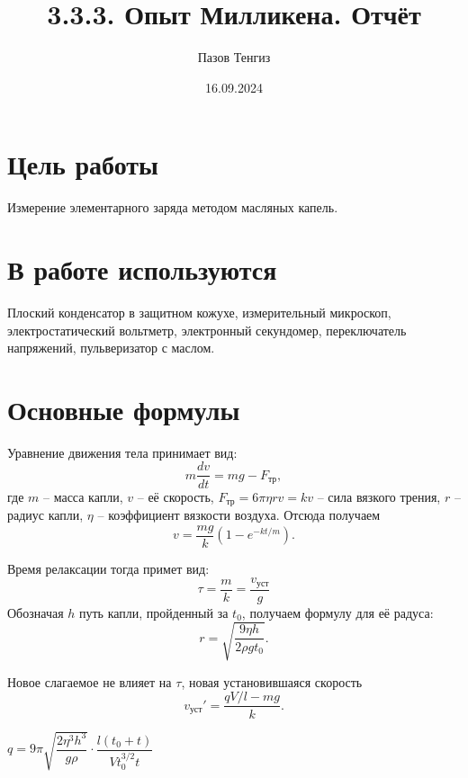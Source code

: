 \documentclass[a4paper,12pt]{article}
\author{Пазов Тенгиз}
\title{3.3.3. Опыт Милликена. Отчёт}
\date{16.09.2024}
\begin{document}
\maketitle
\newpage
\section{Цель работы} 
Измерение элементарного заряда методом масляных капель.
\section{В работе используются} 
Плоский конденсатор в защитном кожухе, измерительный микроскоп, электростатический вольтметр, электронный секундомер, переключатель напряжений, пульверизатор с маслом. 
\section*{Основные формулы}
Уравнение движения тела принимает вид:
\begin{equation}
m \dfrac{dv}{dt}=mg-F_{\text{тр}},
\end{equation}
где $m$ -- масса капли, $v$ -- её скорость, $F_{\text{тр}}=6\pi \eta rv = kv$ -- сила вязкого трения, $r$ -- радиус капли, $\eta$ -- коэффициент вязкости воздуха. Отсюда получаем 
\begin{equation}
v = \dfrac{mg}{k}\left(1 - e^{-kt/m}\right).
\end{equation}
\par Время релаксации тогда примет вид:
$$
\tau = \dfrac{m}{k}=\frac{v_{\text{уст}}}{g}$$
Обозначая $h$ путь капли, пройденный за $t_0$, получаем формулу для её радуса:
\begin{equation}
r = \sqrt{\dfrac{9\eta h}{2\rho gt_0}}.
\end{equation}

Новое слагаемое не влияет на $\tau$, новая установившаяся скорость
$$
v_{\text{уст}}'=\dfrac{qV/l - mg}{k}.
$$

\begin{center}
{$q = 9\pi \sqrt{\dfrac{2\eta^3 h^3}{g\rho}}\cdot \dfrac{l(t_0+t)}{Vt^{3/2}_0t}$}
\end{center}
\end{document}
